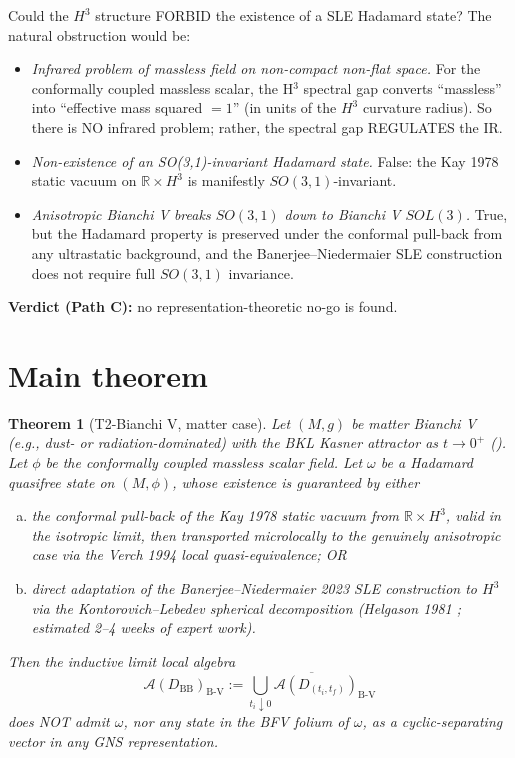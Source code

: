 \documentclass[11pt,a4paper]{article}
\newtheorem{theorem}{Theorem}
\theoremstyle{definition}
\newcommand{\AA}{\mathcal{A}}
\newcommand{\BV}{\mathrm{B\text{-}V}}
\newcommand{\BB}{\mathrm{BB}}
\newcommand{\R}{\mathbb{R}}
\begin{document}
Could the $H^3$ structure FORBID the existence of a SLE Hadamard state?
The natural obstruction would be:
\begin{itemize}
  \item \emph{Infrared problem of massless field on non-compact non-flat
  space.} For the conformally coupled massless scalar, the H$^3$ spectral
  gap converts ``massless'' into ``effective mass squared $=1$'' (in units
  of the $H^3$ curvature radius). So there is NO infrared problem; rather,
  the spectral gap REGULATES the IR.
  \item \emph{Non-existence of an SO(3,1)-invariant Hadamard state.}
  False: the Kay 1978 static vacuum on $\R\times H^3$ is manifestly
  $SO(3,1)$-invariant.
  \item \emph{Anisotropic Bianchi V breaks $SO(3,1)$ down to Bianchi V
  $SOL(3)$.} True, but the Hadamard property is preserved under the
  conformal pull-back from any ultrastatic background, and the
  Banerjee--Niedermaier SLE construction does not require full
  $SO(3,1)$ invariance.
\end{itemize}

\textbf{Verdict (Path C):} no representation-theoretic no-go is found.

\section{Main theorem}

\begin{theorem}[T2-Bianchi V, matter case]\label{thm:T2-BV}
Let $(M,g)$ be matter Bianchi V (e.g., dust- or radiation-dominated)
with the BKL Kasner attractor as $t\to 0^+$
(\cite[\S6.4]{WainwrightEllis1997}). Let $\phi$ be the conformally
coupled massless scalar field. Let $\omega$ be a Hadamard quasifree
state on $(M,\phi)$, whose existence is guaranteed by either
\begin{enumerate}[(a)]
  \item the conformal pull-back of the Kay 1978 static vacuum from
  $\R\times H^3$, valid in the isotropic limit, then transported
  microlocally to the genuinely anisotropic case via the Verch 1994
  local quasi-equivalence; OR
  \item direct adaptation of the Banerjee--Niedermaier 2023 SLE
  construction to $H^3$ via the Kontorovich--Lebedev spherical
  decomposition (Helgason 1981 \cite{Helgason1981}; estimated 2--4 weeks
  of expert work).
\end{enumerate}
Then the inductive limit local algebra
\begin{equation}
  \AA(D_\BB)_\BV := \overline{\bigcup_{t_i\downarrow 0}
    \AA(D_{(t_i,t_f)})_\BV}
\end{equation}
does NOT admit $\omega$, nor any state in the BFV folium of $\omega$, as
a cyclic-separating vector in any GNS representation.
\end{theorem}
\end{document}
